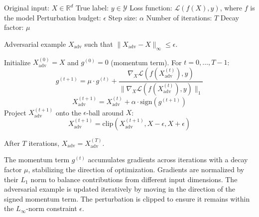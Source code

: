 Original input: $X \in \mathbb{R}^d$
True label: $y \in \mathcal{Y}$
Loss function: $\mathcal{L}(f(X), y)$, where $f$ is the model
Perturbation budget: $\epsilon$
Step size: $\alpha$
Number of iterations: $T$
Decay factor: $\mu$


Adversarial example $X_{\text{adv}}$ such that $\|X_{\text{adv}} - X\|_\infty \leq \epsilon$.

Initialize $X^{(0)}_{\text{adv}} = X$ and $g^{(0)} = 0$ (momentum term). For $t = 0, \dots, T-1$:
\[
g^{(t+1)} = \mu \cdot g^{(t)} + \frac{\nabla_X \mathcal{L}(f(X^{(t)}_{\text{adv}}), y)}{\|\nabla_X \mathcal{L}(f(X^{(t)}_{\text{adv}}), y)\|_1}
\]
\[
X^{(t+1)}_{\text{adv}} = X^{(t)}_{\text{adv}} + \alpha \cdot \text{sign}(g^{(t+1)})
\]
Project $X^{(t+1)}_{\text{adv}}$ onto the $\epsilon$-ball around $X$:
\[
X^{(t+1)}_{\text{adv}} = \text{clip}(X^{(t+1)}_{\text{adv}}, X - \epsilon, X + \epsilon)
\]

After $T$ iterations, $X_{\text{adv}} = X^{(T)}_{\text{adv}}$.

The momentum term $g^{(t)}$ accumulates gradients across iterations with a decay factor $\mu$, stabilizing the direction of optimization. Gradients are normalized by their $L_1$ norm to balance contributions from different input dimensions. The adversarial example is updated iteratively by moving in the direction of the signed momentum term. The perturbation is clipped to ensure it remains within the $L_\infty$-norm constraint $\epsilon$.
